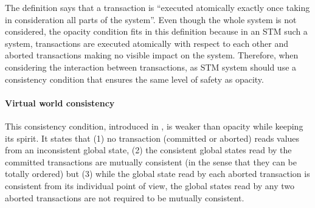 The definition says that a transaction is ``executed atomically exactly once
taking in consideration all parts of the system''.
Even though the whole system is not considered, the opacity condition fits
in this definition because
in an STM such a system, transactions are executed atomically
with respect to each other and aborted transactions making no visible
impact on the system.
Therefore, when considering the interaction between transactions,
as STM system should use a consistency condition that ensures the same
level of safety as opacity.


\paragraph{Virtual world consistency}
This consistency condition, introduced in \cite{IR09},  is 
weaker  than  opacity while  keeping  its spirit.  It  states  that (1)  no
transaction (committed or aborted)  reads values from an inconsistent global
state, (2)  the consistent global states read by the committed transactions 
are   mutually consistent (in the sense that they can be totally  ordered)  
but    (3)  while the  global  state read  by each aborted transaction  is
consistent from its individual point  of view, the  global states read by
any two aborted  transactions are not  required to be  mutually consistent.  

% 



